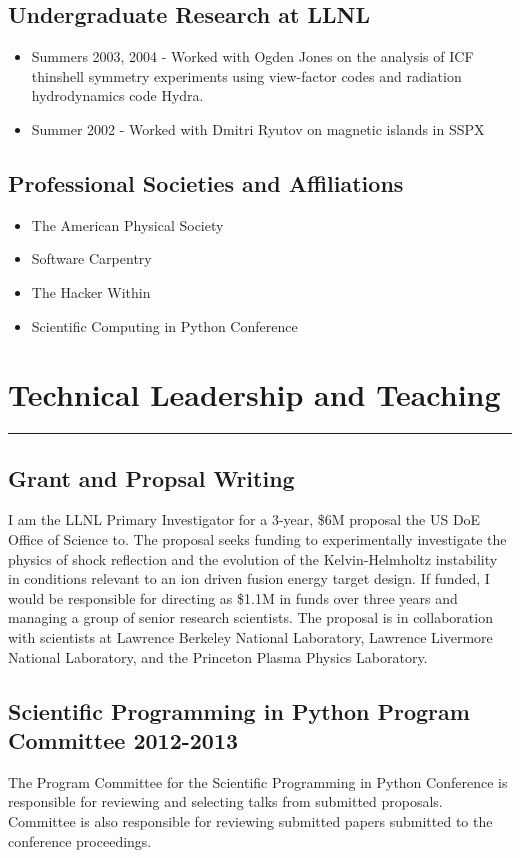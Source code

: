 \documentclass[letterpaper,11pt]{article}
\begin{document}
\subsection*{Undergraduate Research at LLNL}
\begin{itemize}
	\item Summers 2003, 2004 - Worked with Ogden Jones on the analysis of ICF thinshell symmetry experiments using view-factor codes and radiation hydrodynamics code Hydra.
	\item Summer 2002 -  Worked with Dmitri Ryutov on magnetic islands in SSPX
\end{itemize}

\subsection*{Professional Societies and Affiliations}
\begin{itemize}
	\item The American Physical Society
	\item Software Carpentry
	\item The Hacker Within
	\item Scientific Computing in Python Conference
\end{itemize}

\pagebreak

\section*{Technical Leadership and Teaching}
\hrule
\vspace{0.05in}
\subsection*{Grant and Propsal Writing}
I am the LLNL Primary Investigator for a 3-year, \$6M proposal the US DoE
Office of Science to.  The proposal seeks funding to  experimentally investigate
the physics of shock reflection and the evolution of the Kelvin-Helmholtz
instability in conditions relevant to an ion driven fusion energy target
design.  If funded, I would be responsible for directing as \$1.1M in funds
over three years and managing a group of senior research scientists.  The
proposal is in collaboration with scientists at Lawrence Berkeley National
Laboratory, Lawrence Livermore National Laboratory, and the Princeton Plasma
Physics Laboratory.

\subsection*{Scientific Programming in Python Program Committee 2012-2013}
The Program Committee for the Scientific Programming in Python Conference is
responsible for reviewing and selecting talks from submitted proposals.
Committee is also responsible for reviewing submitted papers submitted to the
conference proceedings.
\end{document}
